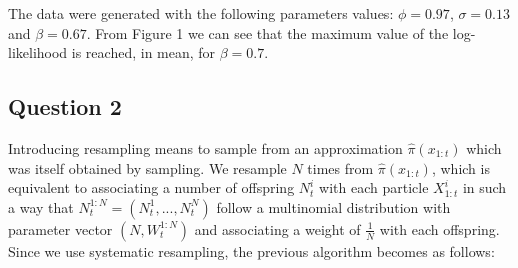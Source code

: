 \documentclass[]{article}
\begin{document}
The data were generated with the following parameters values: $\phi = 0.97$, $\sigma=0.13$ and $\beta=0.67$. From Figure 1 we can see that the maximum value of the log-likelihood is reached, in mean, for $\beta=0.7$.

\subsection*{Question 2}
Introducing resampling means to sample from an approximation $\hat{\pi}(x_{1:t})$ which was itself obtained by sampling. We resample $N$ times from $\hat{\pi}(x_{1:t})$, which is equivalent to associating a number of offspring $N_t^i$ with each particle $X_{1:t}^i$ in such a way that $N_t^{1:N} = (N_t^1, ..., N_t^N)$ follow a multinomial distribution with parameter vector $(N, W_t^{1:N})$ and associating a weight of $\frac{1}{N}$ with each offspring. Since we use systematic resampling, the previous algorithm becomes as follows:
\end{document}

